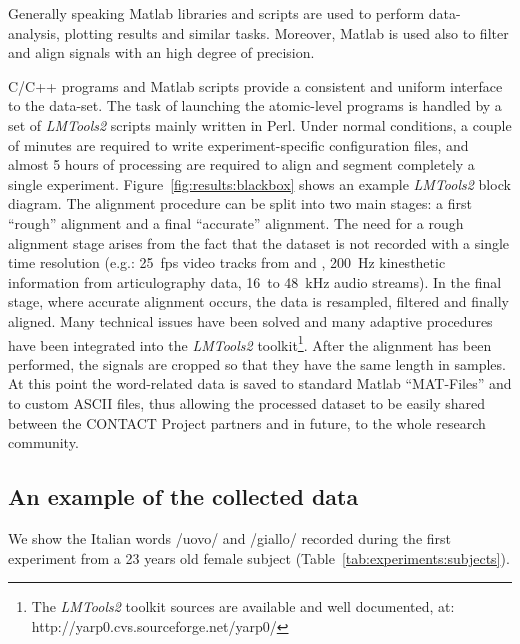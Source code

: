 Generally speaking Matlab libraries and scripts are used to perform
data-analysis, plotting results and similar tasks.
Moreover, Matlab is used also to filter and align signals with an
high degree of precision.

C/C++ programs and Matlab scripts provide a consistent and uniform interface to
the data-set.
The task of launching the atomic-level programs is handled by a set of
\emph{LMTools2} scripts mainly written in Perl.
Under normal conditions, a couple of minutes are required to write
experiment-specific configuration files, and almost 5 hours of processing 
are required to align and segment completely a single
experiment.
Figure~\ref{fig:results:blackbox} shows an example \emph{LMTools2} block
diagram.
The alignment procedure can be split into two main stages: a first ``rough''
alignment and a final ``accurate'' alignment.
The need for a rough alignment stage arises from the fact that the dataset
is not recorded with a single time resolution (e.g.: 25~fps video tracks from
 and , 200~Hz kinesthetic information from articulography data,
16~to 48~kHz audio streams).
In the final stage, where accurate alignment occurs, the data is resampled,
filtered and finally aligned.
Many technical issues have been solved and many adaptive procedures have been
integrated into the \emph{LMTools2} toolkit\footnote{The \emph{LMTools2}
toolkit sources are available and well documented, at: http://yarp0.cvs.sourceforge.net/yarp0/}.
%
%
%
After the alignment has been performed, the signals are cropped so that they 
have the same length in samples. At this point the word-related data is saved to
standard Matlab ``MAT-Files'' and to custom ASCII files, thus allowing the 
processed dataset to be easily shared between the CONTACT Project partners and
in future, to the whole research community.
\subsection{An example of the collected data}
We show the Italian words  /uovo/
and  /giallo/  recorded during the first experiment from a 23
years old female subject (Table~\ref{tab:experiments:subjects}).

